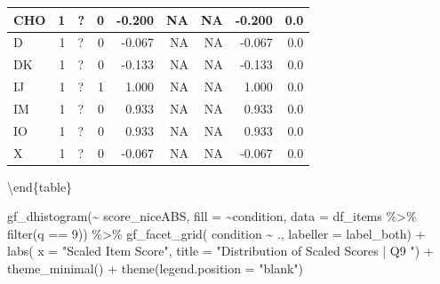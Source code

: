 \documentclass[
  letterpaper,
  DIV=11,
  numbers=noendperiod]{scrreprt}
\newenvironment{Shaded}{\begin{snugshade}}{\end{snugshade}}
\newcommand{\AttributeTok}[1]{\textcolor[rgb]{0.40,0.45,0.13}{#1}}
\newcommand{\DecValTok}[1]{\textcolor[rgb]{0.68,0.00,0.00}{#1}}
\newcommand{\FunctionTok}[1]{\textcolor[rgb]{0.28,0.35,0.67}{#1}}
\newcommand{\NormalTok}[1]{\textcolor[rgb]{0.00,0.23,0.31}{#1}}
\newcommand{\SpecialCharTok}[1]{\textcolor[rgb]{0.37,0.37,0.37}{#1}}
\newcommand{\StringTok}[1]{\textcolor[rgb]{0.13,0.47,0.30}{#1}}
\begin{document}
\begin{tabular}[t]{l|r|l|r|r|r|r|r|r}
\hline
\hspace{1em}CHO & 1 & ? & 0 & -0.200 & NA & NA & -0.200 & 0.0\\
\hline
\hspace{1em}D & 1 & ? & 0 & -0.067 & NA & NA & -0.067 & 0.0\\
\hline
\hspace{1em}DK & 1 & ? & 0 & -0.133 & NA & NA & -0.133 & 0.0\\
\hline
\hspace{1em}IJ & 1 & ? & 1 & 1.000 & NA & NA & 1.000 & 0.0\\
\hline
\hspace{1em}IM & 1 & ? & 0 & 0.933 & NA & NA & 0.933 & 0.0\\
\hline
\hspace{1em}IO & 1 & ? & 0 & 0.933 & NA & NA & 0.933 & 0.0\\
\hline
\hspace{1em}X & 1 & ? & 0 & -0.067 & NA & NA & -0.067 & 0.0\\
\hline
\end{tabular}

\textbackslash end\{table\}

\begin{Shaded}
\begin{Highlighting}[]
\FunctionTok{gf\_dhistogram}\NormalTok{(}\SpecialCharTok{\textasciitilde{}}\NormalTok{ score\_niceABS, }\AttributeTok{fill =} \SpecialCharTok{\textasciitilde{}}\NormalTok{condition, }\AttributeTok{data =}\NormalTok{ df\_items }\SpecialCharTok{\%\textgreater{}\%} \FunctionTok{filter}\NormalTok{(q }\SpecialCharTok{==} \DecValTok{9}\NormalTok{)) }\SpecialCharTok{\%\textgreater{}\%} 
  \FunctionTok{gf\_facet\_grid}\NormalTok{( condition }\SpecialCharTok{\textasciitilde{}}\NormalTok{ ., }\AttributeTok{labeller =}\NormalTok{ label\_both) }\SpecialCharTok{+} 
  \FunctionTok{labs}\NormalTok{( }\AttributeTok{x =} \StringTok{"Scaled Item Score"}\NormalTok{, }\AttributeTok{title =} \StringTok{"Distribution of Scaled Scores | Q9 "}\NormalTok{) }\SpecialCharTok{+} 
  \FunctionTok{theme\_minimal}\NormalTok{() }\SpecialCharTok{+} \FunctionTok{theme}\NormalTok{(}\AttributeTok{legend.position =} \StringTok{"blank"}\NormalTok{)}
\end{Highlighting}
\end{Shaded}
\end{document}
